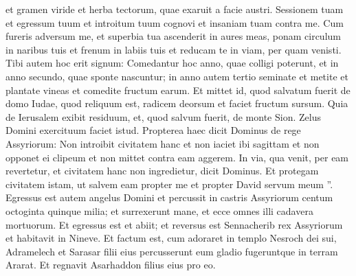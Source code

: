 \begin{biblechapter}
\begin{biblechapter}
\begin{biblechapter}
\begin{biblechapter}
\begin{biblechapter}
\begin{biblechapter}
\begin{biblechapter}
\begin{biblechapter}
\begin{biblechapter}
\begin{biblechapter}
\begin{biblechapter}
\begin{biblechapter}
\begin{biblechapter}
\begin{biblechapter}
\begin{biblechapter}
\begin{biblechapter}
\begin{biblechapter}
\begin{biblechapter}
\begin{biblechapter}
\begin{biblechapter}
\begin{biblechapter}
\begin{biblechapter}
\begin{biblechapter}
\begin{biblechapter}
\begin{biblechapter}
\begin{biblechapter}
\begin{biblechapter}
\begin{biblechapter}
\begin{biblechapter}
\begin{biblechapter}
\begin{biblechapter}
\begin{biblechapter}
\begin{biblechapter}
\begin{biblechapter}
\begin{biblechapter}
\begin{biblechapter}
\begin{biblechapter}
 et gramen viride et herba tectorum, quae exaruit a facie austri.
 \verse Sessionem tuam
 et egressum tuum et introitum tuum cognovi
 et insaniam tuam contra me.
 \verse Cum fureris adversum me,
 et superbia tua ascenderit in aures meas,
 ponam circulum in naribus tuis
 et frenum in labiis tuis
 et reducam te in viam,
 per quam venisti.
 \verse Tibi autem hoc erit signum:
 Comedantur hoc anno, quae colligi poterunt,
 et in anno secundo, quae sponte nascuntur;
 in anno autem tertio seminate et metite
 et plantate vineas et comedite fructum earum.
 \verse Et mittet id, quod salvatum fuerit de domo Iudae,
 quod reliquum est, radicem deorsum
 et faciet fructum sursum.
 \verse Quia de Ierusalem exibit residuum,
 et, quod salvum fuerit, de monte Sion.
 Zelus Domini exercituum faciet istud.
 \verse Propterea haec dicit Dominus de rege Assyriorum:
 Non introibit civitatem hanc
 et non iaciet ibi sagittam
 et non opponet ei clipeum
 et non mittet contra eam aggerem.
 \verse In via, qua venit, per eam revertetur,
 et civitatem hanc non ingredietur, dicit Dominus.
 \verse Et protegam civitatem istam, ut salvem eam
 propter me et propter David servum meum ”.
 \verse Egressus est autem angelus Domini et percussit in castris Assyriorum centum octoginta quinque milia; et surrexerunt mane, et ecce omnes illi cadavera mortuorum.
 \verse Et egressus est et abiit; et reversus est Sennacherib rex Assyriorum et habitavit in Nineve. 
\verse Et factum est, cum adoraret in templo Nesroch dei sui, Adramelech et Sarasar filii eius percusserunt eum gladio fugeruntque in terram Ararat. Et regnavit Asarhaddon filius eius pro eo.
 

\end{biblechapter}
\end{biblechapter}
\end{biblechapter}
\end{biblechapter}
\end{biblechapter}
\end{biblechapter}
\end{biblechapter}
\end{biblechapter}
\end{biblechapter}
\end{biblechapter}
\end{biblechapter}
\end{biblechapter}
\end{biblechapter}
\end{biblechapter}
\end{biblechapter}
\end{biblechapter}
\end{biblechapter}
\end{biblechapter}
\end{biblechapter}
\end{biblechapter}
\end{biblechapter}
\end{biblechapter}
\end{biblechapter}
\end{biblechapter}
\end{biblechapter}
\end{biblechapter}
\end{biblechapter}
\end{biblechapter}
\end{biblechapter}
\end{biblechapter}
\end{biblechapter}
\end{biblechapter}
\end{biblechapter}
\end{biblechapter}
\end{biblechapter}
\end{biblechapter}
\end{biblechapter}
